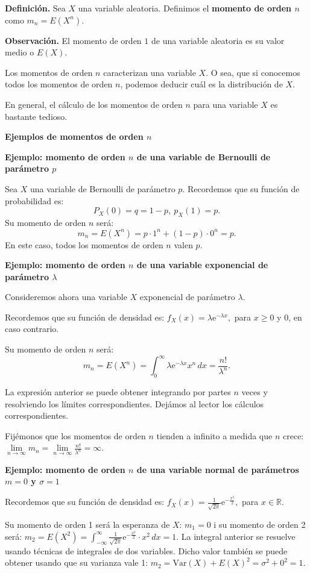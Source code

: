 \documentclass[
  letterpaper,
  DIV=11,
  numbers=noendperiod]{scrreprt}
\begin{document}
\textbf{Definición.} Sea \(X\) una variable aleatoria. Definimos el
\textbf{momento de orden \(n\)} como \(m_n = E\left(X^n\right)\).

\textbf{Observación.} El momento de orden \(1\) de una variable
aleatoria es su valor medio o \(E(X)\).

Los momentos de orden \(n\) caracterizan una variable \(X\). O sea, que
si conocemos todos los momentos de orden \(n\), podemos deducir cuál es
la distribución de \(X\).

En general, el cálculo de los momentos de orden \(n\) para una variable
\(X\) es bastante tedioso.

\textbf{Ejemplos de momentos de orden \(n\)}

\textbf{Ejemplo: momento de orden \(n\) de una variable de Bernoulli de
parámetro \(p\)}

Sea \(X\) una variable de Bernoulli de parámetro \(p\). Recordemos que
su función de probabilidad es: \[
P_X(0)=q=1-p,\ p_X(1)=p.
\] Su momento de orden \(n\) será: \[
m_n = E\left(X^n\right)=p\cdot 1^n+(1-p)\cdot 0^n = p.
\] En este caso, todos los momentos de orden \(n\) valen \(p\).

\textbf{Ejemplo: momento de orden \(n\) de una variable exponencial de
parámetro \(\lambda\)}

Consideremos ahora una variable \(X\) exponencial de parámetro
\(\lambda\).

Recordemos que su función de densidad es:
\(f_X(x)=\lambda \mathrm{e}^{-\lambda x},\) para \(x\geq 0\) y \(0\), en
caso contrario.

Su momento de orden \(n\) será: \[
m_n = E\left(X^n\right)=\int_0^\infty \lambda \mathrm{e}^{-\lambda x} x^n\, dx =\frac{n!}{\lambda^n}.
\]

La expresión anterior se puede obtener integrando por partes \(n\) veces
y resolviendo los límites correspondientes. Dejámos al lector los
cálculos correspondientes.

Fijémonos que los momentos de orden \(n\) tienden a infinito a medida
que \(n\) crece:
\(\lim\limits_{n\to\infty}m_n = \lim\limits_{n\to\infty}\frac{n!}{\lambda^n}=\infty\).

\textbf{Ejemplo: momento de orden \(n\) de una variable normal de
parámetros \(m=0\) y \(\sigma =1\)}

Recordemos que su función de densidad es:
\(f_X(x)=\frac{1}{\sqrt{2\pi}}\mathrm{e}^{-\frac{x^2}{2}},\) para
\(x\in \mathbb{R}\).

Su momento de orden 1 será la esperanza de \(X\): \(m_1 = 0\) i su
momento de orden 2 será:
\(m_2 = E\left(X^2\right)=\int_{-\infty}^\infty \frac{1}{\sqrt{2\pi}}\mathrm{e}^{-\frac{x^2}{2}}\cdot x^2\, dx = 1.\)
La integral anterior se resuelve usando técnicas de integrales de dos
variables. Dicho valor también se puede obtener usando que su varianza
vale 1: \(m_2 = \mathrm{Var}(X)+E(X)^2 = \sigma^2 +0^2 = 1.\)
\end{document}
